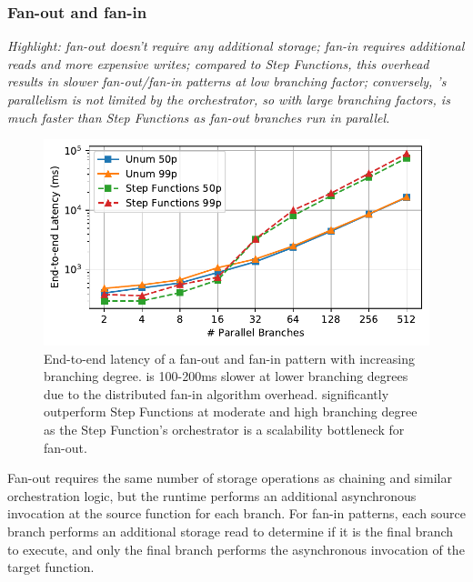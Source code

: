 \subsubsection{Fan-out and fan-in}\label{sec:eval:fan-out}

\emph{Highlight: fan-out doesn't require any additional storage; fan-in requires
additional reads and more expensive writes; compared to Step Functions, this
overhead results in slower fan-out/fan-in patterns at low branching factor;
conversely, \name{}'s parallelism is not limited by the orchestrator, so with
large branching factors, \name{} is much faster than Step Functions as fan-out
branches run in parallel.}

\begin{figure}[t]
  \centering
  \includegraphics[width=\columnwidth]{figures/MapMicroLatency.pdf}
  \caption{End-to-end latency of a fan-out and fan-in pattern with increasing
branching degree. \name{} is 100-200ms slower at lower branching degrees due to
the distributed fan-in algorithm overhead. \name{} significantly outperform Step
Functions at moderate and high branching degree as the Step Function's
orchestrator is a scalability bottleneck for fan-out.}
  \label{fig:mapmicrolatency}
\end{figure}

Fan-out requires the same number of storage operations as chaining and similar
orchestration logic, but the \name{} runtime performs an additional asynchronous
invocation at the source function for each branch. For fan-in patterns, each
source branch performs an additional storage read to determine if it is the
final branch to execute, and only the final branch performs the asynchronous
invocation of the target function.


